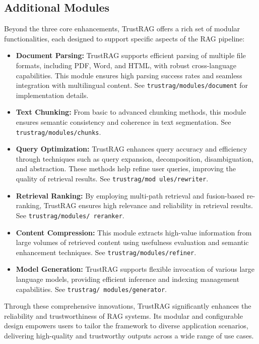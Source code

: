 \subsection{Additional Modules}
Beyond the three core enhancements, TrustRAG offers a rich set of modular functionalities, each designed to support specific aspects of the RAG pipeline:
\begin{itemize}
    \item \textbf{Document Parsing:} TrustRAG supports efficient parsing of multiple file formats, including PDF, Word, and HTML, with robust cross-language capabilities. This module ensures high parsing success rates and seamless integration with multilingual content. See \texttt{trustrag/modules/document} for implementation details.
    
    \item \textbf{Text Chunking:} From basic to advanced chunking methods, this module ensures semantic consistency and coherence in text segmentation. See \texttt{trustrag/modules/chunks}.
    
    \item \textbf{Query Optimization:} TrustRAG enhances query accuracy and efficiency through techniques such as query expansion, decomposition, disambiguation, and abstraction. These methods help refine user queries, improving the quality of retrieval results. See \texttt{trustrag/mod
    ules/rewriter}.
    
    \item \textbf{Retrieval Ranking:} By employing multi-path retrieval and fusion-based re-ranking, TrustRAG ensures high relevance and reliability in retrieval results. See \texttt{trustrag/modules/
    reranker}.
    
    \item \textbf{Content Compression:} This module extracts high-value information from large volumes of retrieved content using usefulness evaluation and semantic enhancement techniques. See \texttt{trustrag/modules/refiner}.
    
    \item \textbf{Model Generation:} TrustRAG supports flexible invocation of various large language models, providing efficient inference and indexing management capabilities. See \texttt{trustrag/
    modules/generator}.
\end{itemize}

Through these comprehensive innovations, TrustRAG significantly enhances the reliability and trustworthiness of RAG systems. Its modular and configurable design empowers users to tailor the framework to diverse application scenarios, delivering high-quality and trustworthy outputs across a wide range of use cases.


